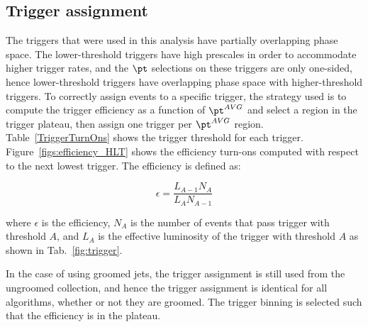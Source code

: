 \subsection{Trigger assignment}
\label{sec:trigAssignment}

The triggers that were used in this analysis have partially overlapping phase space. 
The lower-threshold triggers have high prescales in order to accommodate higher
trigger rates, and the $\pt$ selections on these triggers are only one-sided,
hence lower-threshold triggers have overlapping phase space with higher-threshold
triggers. To correctly assign events to a specific trigger, the
strategy used is to compute the trigger efficiency as a function
of $\pt^{AVG}$ and select a region in the trigger plateau, then
assign one trigger per $\pt^{AVG}$ region. Table~\ref{TriggerTurnOns}
shows the trigger threshold for each trigger.
Figure~\ref{figs:efficiency_HLT}
shows the efficiency turn-ons computed with respect to the
next lowest trigger. The efficiency is defined as:

\begin{equation}
\epsilon = \frac{L_{A-1} N_{A}}{L_{A} N_{A-1}}
\end{equation}

where $\epsilon$ is the efficiency, $N_{A}$ is the number of
events that pass trigger with threshold $A$, and $L_{A}$ is the
effective luminosity of the trigger with threshold $A$ as shown
in Tab.~\ref{fig:trigger}. 


In the case of using
groomed jets, the trigger assignment is still used from the ungroomed
collection, and hence the trigger assignment is identical for all
algorithms, whether or not they are groomed. 
The trigger binning is selected such that the efficiency is in the
plateau. 

